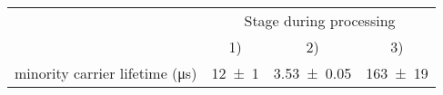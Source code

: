 \begin{tabular}{@{}llll@{}}
\toprule
 & \multicolumn{3}{c}{Stage during processing} \\ \cmidrule(l){2-4} 
 & \multicolumn{1}{c}{1)} & \multicolumn{1}{c}{2)} & \multicolumn{1}{c}{3)} \\ \midrule
minority carrier lifetime (\si{\micro\second}) & \num{12+-1} & \num{3.53+-0.05} & \num{163+-19} \\ \bottomrule
\end{tabular}